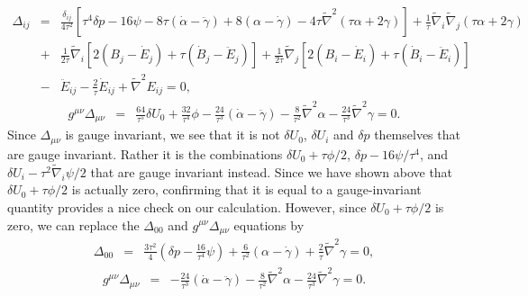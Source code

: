 \documentclass[aps,onecolumn,10pt]{revtex4}
\numberwithin{equation}{section}
\numberwithin{equation}{section}
\begin{document}
%
\begin{eqnarray}
 \Delta_{ij}&=&\frac{\delta_{ij}}{4\tau^2}\left[\tau^4\delta p-16\psi-8\tau(\dot{\alpha}-\ddot{\gamma})+8(\alpha-\dot{\gamma})-4\tau \tilde{\nabla}^2(\tau\alpha+2\gamma)\right]
+\frac{1}{\tau}\tilde{\nabla}_i\tilde{\nabla}_j(\tau\alpha+2\gamma)
\nonumber\\
&+&\frac{1}{2\tau}\tilde{\nabla}_i[2(B_j-\dot{E}_j)+\tau(\dot{B}_j-\ddot{E}_j)]
+\frac{1}{2\tau}\tilde{\nabla}_j[2(B_i-\dot{E}_i)+\tau(\dot{B}_i-\ddot{E}_i)]
\nonumber\\
&-&\ddot{E}_{ij}-\frac{2}{\tau}\dot{E}_{ij}+\tilde{\nabla}^2E_{ij}=0,
\label{8.10}
\end{eqnarray}
%
\begin{eqnarray}
g^{\mu\nu}\Delta_{\mu\nu}&=&\frac{64}{\tau^5}\delta U_0+\frac{32}{\tau^4}\phi -\frac{24}{\tau^3}(\dot{\alpha}-\ddot{\gamma})-\frac{8}{\tau^2}\tilde{\nabla}^2\alpha-\frac{24}{\tau^3}\tilde{\nabla}^2\gamma=0.
\label{8.11}
\end{eqnarray}
%
Since $\Delta_{\mu\nu}$ is gauge invariant, we see that it is not $\delta U_0$, $\delta U_i$ and $\delta p$ themselves that are gauge invariant. Rather it is the combinations $\delta U_0+\tau\phi/2$, $\delta p-16\psi/\tau^4$, and $\delta U_i-\tau^2\tilde{\nabla}_i\psi/2$ that are gauge invariant instead. Since we have shown above that $\delta U_0+\tau\phi/2$ is actually zero, confirming that it is equal to a gauge-invariant quantity provides a nice check on our calculation. However, since $\delta U_0+\tau\phi/2$ is zero, we can replace the $\Delta_{00}$ and $g^{\mu\nu}\Delta_{\mu\nu}$ equations by 
%
\begin{eqnarray}
 \Delta_{00}&=&\frac{3\tau^2}{4}\left(\delta p -\frac{16}{\tau^4}\psi\right)
 +\frac{6}{\tau^2}(\alpha-\dot{\gamma})+\frac{2}{\tau}\tilde{\nabla}^2\gamma=0,
\label{8.12}
\end{eqnarray}
%
%
\begin{eqnarray}
g^{\mu\nu}\Delta_{\mu\nu}&=& -\frac{24}{\tau^3}(\dot{\alpha}-\ddot{\gamma})-\frac{8}{\tau^2}\tilde{\nabla}^2\alpha-\frac{24}{\tau^3}\tilde{\nabla}^2\gamma=0.
\label{8.13}
\end{eqnarray}
%
\end{document}
